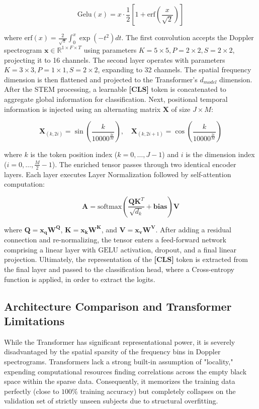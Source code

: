 $$\text{Gelu}(x) = x \cdot \frac{1}{2} \left[1 + \text{erf}\left(\frac{x}{\sqrt{2}}\right)\right]$$

where $\text{erf}(x) = \frac{2}{\sqrt{\pi}} \int_{0}^{x}{\exp(-t^2)dt}$. The first convolution accepts the Doppler spectrogram $\mathbf{x} \in \mathbb{R}^{1 \times F \times T}$ using parameters $K = 5 \times 5, P = 2 \times 2, S = 2 \times 2$, projecting it to 16 channels. The second layer operates with parameters $K = 3 \times 3, P = 1 \times 1, S = 2 \times 2$, expanding to 32 channels. The spatial frequency dimension is then flattened and projected to the Transformer's $d_{model}$ dimension. After the STEM processing, a learnable \textbf{[CLS]} token is concatenated to aggregate global information for classification. Next, positional temporal information is injected using an alternating matrix $\mathbf{X}$ of size $J \times M$:

$$\mathbf{X}_{(k, 2i)} = \sin\left(\frac{k}{10000^{\frac{2i}{M}}}\right), \quad \mathbf{X}_{(k, 2i+1)} = \cos\left(\frac{k}{10000^{\frac{2i}{M}}}\right)$$

where $k$ is the token position index ($k = 0, \dots, J-1$) and $i$ is the dimension index ($i = 0, \dots, \frac{M}{2} - 1$). The enriched tensor passes through two identical encoder layers. Each layer executes Layer Normalization followed by self-attention computation:

$$\mathbf{A} = \text{softmax}\left(\frac{\mathbf{Q}\mathbf{K}^{T}}{\sqrt{d_k}} + \mathbf{bias}\right) \mathbf{V}$$

where $\mathbf{Q} = \mathbf{x_{q}} \mathbf{W^{Q}}$, $\mathbf{K} = \mathbf{x_{k}} \mathbf{W^{K}}$, and $\mathbf{V} = \mathbf{x_{v}} \mathbf{W^{V}}$. After adding a residual connection and re-normalizing, the tensor enters a feed-forward network comprising a linear layer with $\text{GELU}$ activation, dropout, and a final linear projection. Ultimately, the representation of the \textbf{[CLS]} token is extracted from the final layer and passed to the classification head, where a Cross-entropy function is applied, in order to extract the logits.

\subsection{Architecture Comparison and Transformer Limitations}
While the Transformer has significant representational power, it is severely disadvantaged by the spatial sparsity of the frequency bins in Doppler spectrograms. Transformers lack a strong built-in assumption of "locality," expending computational resources finding correlations across the empty black space within the sparse data. Consequently, it memorizes the training data perfectly (close to $100\%$ training accuracy) but completely collapses on the validation set of strictly unseen subjects due to structural overfitting. 

